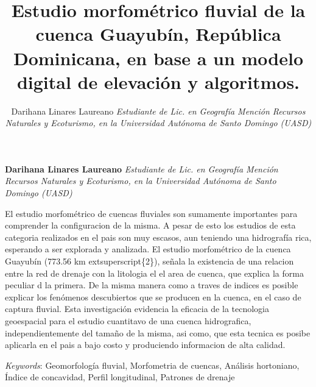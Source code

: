 \documentclass[11pt,]{article}
\title{Estudio morfométrico fluvial de la cuenca Guayubín, República
Dominicana, en base a un modelo digital de elevación y algoritmos.  }
\author{\Large Darihana Linares Laureano\vspace{0.05in} \newline\normalsize\emph{Estudiante de Lic. en Geografía Mención Recursos Naturales y Ecoturismo,
en la Universidad Autónoma de Santo Domingo (UASD)}  }
\date{}
\newcommand*{\authorfont}{\fontfamily{phv}\selectfont}
\renewenvironment{abstract}
 {{%
    \setlength{\leftmargin}{0mm}
    \setlength{\rightmargin}{\leftmargin}%
  }%
  \relax}
 {\endlist}
\begin{document}
	
%

{%
\setlength{\parindent}{0pt}
\thispagestyle{plain}
{\fontsize{18}{20}\selectfont\raggedright 
\maketitle  %

}

{
   \vskip 13.5pt\relax \normalsize\fontsize{11}{12} 
\textbf{\authorfont Darihana Linares Laureano} \hskip 15pt \emph{\small Estudiante de Lic. en Geografía Mención Recursos Naturales y Ecoturismo,
en la Universidad Autónoma de Santo Domingo (UASD)}   

}

}








\begin{abstract}

    \hbox{\vrule height .2pt width 39.14pc}

    \vskip 8.5pt %

\noindent El estudio morfométrico de cuencas fluviales son sumamente importantes
para comprender la configuracion de la misma. A pesar de esto los
estudios de esta categoria realizados en el pais son muy escasos, aun
teniendo una hidrografía rica, esperando a ser explorada y analizada. El
estudio morfométrico de la cuenca Guayubín (773.56 km
extsuperscript\{2\}), señala la existencia de una relacion entre la red
de drenaje con la litologia el el area de cuenca, que explica la forma
peculiar d la primera. De la misma manera como a traves de indices es
posible explicar los fenómenos descubiertos que se producen en la
cuenca, en el caso de captura fluvial. Esta investigación evidencia la
eficacia de la tecnologia geoespacial para el estudio cuantitavo de una
cuenca hidrografica, independientemente del tamaño de la misma, asi
como, que esta tecnica es posibe aplicarla en el pais a bajo costo y
produciendo informacion de alta calidad.


\vskip 8.5pt \noindent \emph{Keywords}: Geomorfología fluvial, Morfometria de cuencas, Análisis hortoniano,
Índice de concavidad, Perfil longitudinal, Patrones de drenaje \par

    \hbox{\vrule height .2pt width 39.14pc}



\end{abstract}
\end{document}
